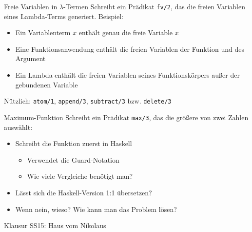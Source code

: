 \documentclass{beamer}
\begin{document}
\begin{frame}{Freie Variablen in $\lambda$-Termen}
    Schreibt ein Prädikat \texttt{fv/2}, das die freien Variablen eines Lambda-Terms generiert. Beispiel:


    \begin{itemize}
        \item Ein Variablenterm $x$ enthält genau die freie Variable $x$
        \item Eine Funktionsanwendung enthält die freien Variablen der Funktion und des Argument
        \item Ein Lambda enthält die freien Variablen seines Funktionskörpers außer der gebundenen Variable
    \end{itemize}

    Nützlich: \texttt{atom/1}, \texttt{append/3}, \texttt{subtract/3} bzw. \texttt{delete/3}
\end{frame}

\begin{frame}{Maximum-Funktion}
    Schreibt ein Prädikat \texttt{max/3}, das die größere von zwei Zahlen auswählt:


    \begin{itemize}
        \item Schreibt die Funktion zuerst in Haskell
        \begin{itemize}
            \item Verwendet die Guard-Notation
            \item Wie viele Vergleiche benötigt man?
        \end{itemize}
        \item Lässt sich die Haskell-Version 1:1 übersetzen?
        \item Wenn nein, wieso? Wie kann man das Problem lösen?
    \end{itemize}
\end{frame}

\begin{frame}{Klausur SS15: Haus vom Nikolaus}
\end{frame}
\end{document}
